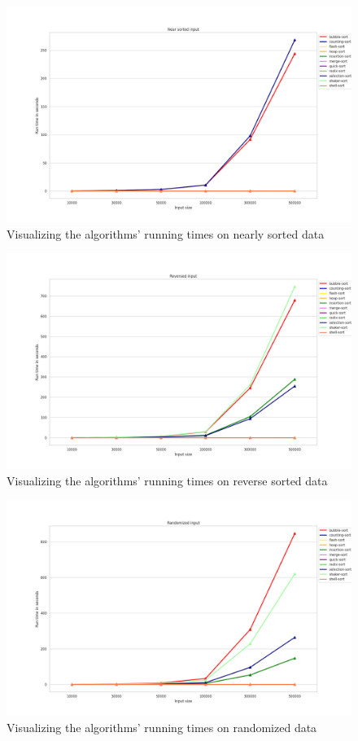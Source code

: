 \documentclass[11pt,a4paper]{article}
\begin{document}
\begin{figure}[H]
  \includegraphics[width = 16cm]{plot/nsorted_line.png}
  \centering
  \caption{Visualizing the algorithms' running times on nearly sorted data}
\end{figure}

\begin{figure}[H]
  \includegraphics[width = 16cm]{plot/rev_line.png}
  \centering
  \caption{Visualizing the algorithms' running times on reverse sorted data}
\end{figure}

\begin{figure}[H]
  \includegraphics[width = 16cm]{plot/rand_line.png}
  \centering
  \caption{Visualizing the algorithms' running times on randomized data}
\end{figure}
\end{document}
